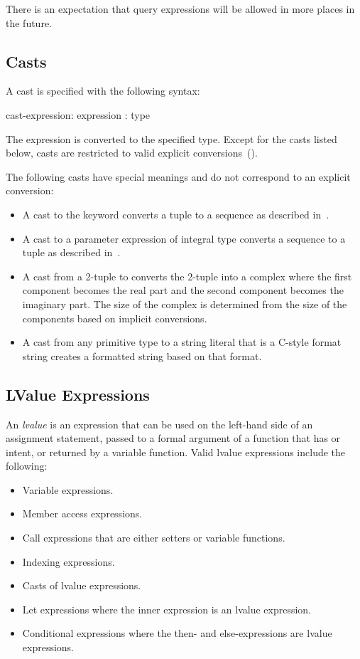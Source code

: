 There is an expectation that query expressions will be allowed in more
places in the future.

\subsection{Casts}
\label{Casts}

A cast is specified with the following syntax:
\begin{syntax}
cast-expression:
  expression : type
\end{syntax}
The expression is converted to the specified type.  Except for the
casts listed below, casts are restricted to valid explicit
conversions~().

The following casts have special meanings and do not correspond to an
explicit conversion:
\begin{itemize}
\item {}
  A cast to the keyword  converts a tuple to a sequence as
  described in~.
\item {}
  A cast to a parameter expression of integral type converts a
  sequence to a tuple as described
  in~.
\item {}
  A cast from a 2-tuple to  converts the 2-tuple into a
  complex where the first component becomes the real part and the
  second component becomes the imaginary part.  The size of the
  complex is determined from the size of the components based on
  implicit conversions.
\item {}
  A cast from any primitive type to a string literal that is a C-style
  format string creates a formatted string based on that format.
\end{itemize}

\subsection{LValue Expressions}
\label{lvalue}

An {\em lvalue} is an expression that can be used on the left-hand
side of an assignment statement, passed to a formal argument of a
function that has  or  intent, or returned by a
variable function.  Valid lvalue expressions include the following:
\begin{itemize}
\item
 Variable expressions.
\item
 Member access expressions.
\item
 Call expressions that are either setters or variable functions.
\item
 Indexing expressions.
\item
 Casts of lvalue expressions.
\item
 Let expressions where the inner expression is an lvalue expression.
\item
 Conditional expressions where the then- and else-expressions are
 lvalue expressions.
\end{itemize}

